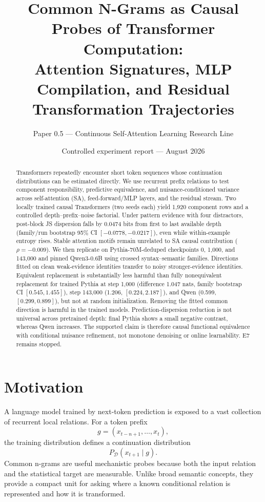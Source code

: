 \documentclass[10pt]{article}
\title{Common N-Grams as Causal Probes of Transformer Computation:\\Attention Signatures, MLP Compilation, and Residual Transformation Trajectories}
\author{Paper 0.5 --- Continuous Self-Attention Learning Research Line}
\date{Controlled experiment report --- August 2026}
\begin{document}
\maketitle

\begin{abstract}
Transformers repeatedly encounter short token sequences whose continuation distributions can be estimated directly. We use recurrent prefix relations to test component responsibility, predictive equivalence, and nuisance-conditioned variance across self-attention (SA), feed-forward/MLP layers, and the residual stream. Two locally trained causal Transformers (two seeds each) yield 1,920 component rows and a controlled depth--prefix--noise factorial. Under pattern evidence with four distractors, post-block JS dispersion falls by 0.0474 bits from first to last available depth (family/run bootstrap 95\% CI $[-0.0778,-0.0217]$), even while within-example entropy rises. Stable attention motifs remain unrelated to SA causal contribution ($\rho=-0.009$). We then replicate on Pythia-70M-deduped checkpoints 0, 1,000, and 143,000 and pinned Qwen3-0.6B using crossed syntax--semantic families. Directions fitted on clean weak-evidence identities transfer to noisy stronger-evidence identities. Equivalent replacement is substantially less harmful than fully nonequivalent replacement for trained Pythia at step 1,000 (difference 1.047 nats, family bootstrap CI $[0.545,1.455]$), step 143,000 (1.206, $[0.224,2.187]$), and Qwen (0.599, $[0.299,0.899]$), but not at random initialization. Removing the fitted common direction is harmful in the trained models. Prediction-dispersion reduction is not universal across pretrained depth: final Pythia shows a small negative contrast, whereas Qwen increases. The supported claim is therefore causal functional equivalence with conditional nuisance refinement, not monotone denoising or online learnability. E7 remains stopped.
\end{abstract}

\section{Motivation}
A language model trained by next-token prediction is exposed to a vast collection of recurrent local relations. For a token prefix
\begin{equation}
 g=(x_{t-n+1},\ldots,x_t),
\end{equation}
the training distribution defines a continuation distribution
\begin{equation}
 P_{\mathcal D}(x_{t+1}\mid g).
\end{equation}
Common n-grams are useful mechanistic probes because both the input relation and the statistical target are measurable. Unlike broad semantic concepts, they provide a compact unit for asking where a known conditional relation is represented and how it is transformed.
\end{document}
